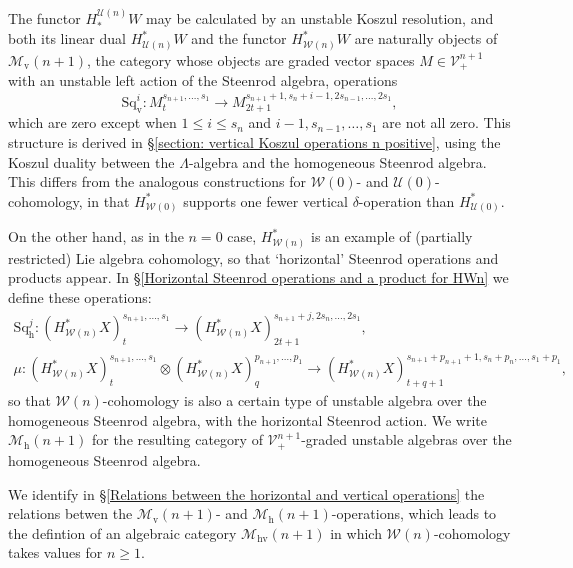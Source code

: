 \documentclass[11pt]{amsart} \renewcommand{\baselinestretch}{1.2}
\theoremstyle{plain}
\numberwithin{equation}{section} %
\theoremstyle{plain}
\numberwithin{equation}{chapter} %
\renewcommand{\to}{\longrightarrow}
\newcommand{\calV}{\mathcal{V}}
\newcommand{\calw}{\mathcal{W}}
\newcommand{\calu}{\mathcal{U}}
\newcommand{\calMv}{\mathcal{M}\dver}
\newcommand{\calMh}{\mathcal{M}\dhor}
\newcommand{\calMhv}{\mathcal{M}_\mathrm{hv}}
\newcommand{\vect}[2]{\calV^{#1}_{#2}}
\newcommand{\dver}{_\mathrm{v}}
\newcommand{\dhor}{_\mathrm{h}}
\newcommand{\Sqh}{\mathrm{Sq}\dhor}
\newcommand{\Sqv}{\mathrm{Sq}\dver}
\begin{document}
\begin{Introduction}
The functor $H_*^{\calu(n)}W$ may be calculated by an unstable Koszul resolution, and both its linear dual $H^*_{\calu(n)}W$ and the functor $H^*_{\calw(n)}W$ are naturally objects of $\calMv(n+1)$, the category whose objects are graded vector spaces $M\in\vect{n+1}{+}$ with an unstable left action of the Steenrod algebra, operations%
\[\Sqv^i:M^{s_{n+1},\ldots,s_1}_t\to M^{s_{n+1}+1,s_n+i-1,2s_{n-1},\ldots,2s_1}_{2t+1},\]
which are zero except when $1\leq i \leq s_n$ and  $i-1,s_{n-1},\ldots,s_1$ are not all zero. This structure is derived in \S\ref{section: vertical Koszul operations n positive}, using the Koszul duality between the $\Lambda$-algebra and the homogeneous Steenrod algebra. This differs from the analogous constructions for $\calw(0)$- and $\calu(0)$-cohomology, in that $H^*_{\calw(0)}$ supports one fewer vertical $\delta$-operation than $H^*_{\calu(0)}$.

On the other hand, as in the $n=0$ case, $H^*_{\calw(n)}$ is an example of (partially restricted) Lie algebra cohomology, so that  `horizontal' Steenrod operations and products  appear. In \S\ref{Horizontal Steenrod operations and a product for HWn} we define these operations:
\begin{gather*}
\Sqh^j:(H^*_{\calw(n)}X)_t^{s_{n+1},\ldots,s_1}\to (H^*_{\calw(n)}X)_{2t+1}^{s_{n+1}+j,2s_{n},\ldots,2s_1},\\
\mu:(H^*_{\calw(n)}X)_t^{s_{n+1},\ldots,s_1}\otimes (H^*_{\calw(n)}X)_q^{p_{n+1},\ldots,p_1}\to (H^*_{\calw(n)}X)_{t+q+1}^{s_{n+1}+p_{n+1}+1,s_{n}+p_{n},\ldots,s_1+p_1},
\end{gather*}
so that $\calw(n)$-cohomology is also a certain type of unstable algebra over the homogeneous Steenrod algebra, %
with the horizontal Steenrod action. We write $\calMh(n+1)$ for the resulting category of $\vect{n+1}{+}$-graded unstable algebras over the homogeneous Steenrod algebra.


We identify in \S\ref{Relations between the horizontal and vertical operations} the relations betwen the $\calMv(n+1)$- and $\calMh(n+1)$-operations, which leads to the defintion of an algebraic category $\calMhv(n+1)$ in which $\calw(n)$-cohomology takes values for $n\geq1$.


\end{Introduction}
\end{document}
